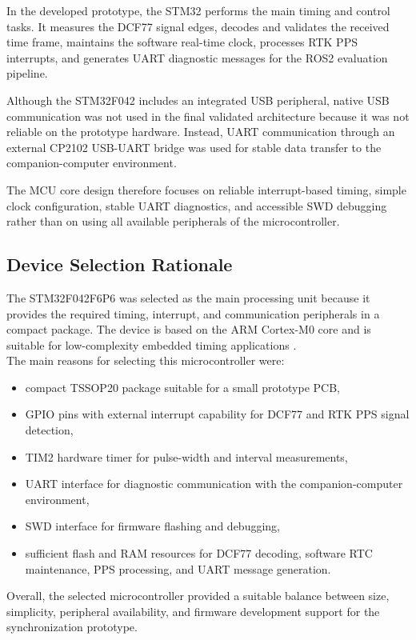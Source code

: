 In the developed prototype, the STM32 performs the main timing and control tasks. It measures the DCF77 signal edges, decodes and validates the received time frame, maintains the software real-time clock, processes RTK PPS interrupts, and generates UART diagnostic messages for the ROS2 evaluation pipeline.

Although the STM32F042 includes an integrated USB peripheral, native USB communication was not used in the final validated architecture because it was not reliable on the prototype hardware. Instead, UART communication through an external CP2102 USB-UART bridge was used for stable data transfer to the companion-computer environment.

The MCU core design therefore focuses on reliable interrupt-based timing, simple clock configuration, stable UART diagnostics, and accessible SWD debugging rather than on using all available peripherals of the microcontroller.

\subsection{Device Selection Rationale}

The STM32F042F6P6 was selected as the main processing unit because it provides the required timing, interrupt, and communication peripherals in a compact package. The device is based on the ARM Cortex-M0 core and is suitable for low-complexity embedded timing applications \cite{stm32F042Datasheet,stm32F0ReferenceManual}.
\\
The main reasons for selecting this microcontroller were:
\begin{itemize}
    \item compact TSSOP20 package suitable for a small prototype PCB,
    \item GPIO pins with external interrupt capability for DCF77 and RTK PPS signal detection,
    \item TIM2 hardware timer for pulse-width and interval measurements,
    \item UART interface for diagnostic communication with the companion-computer environment,
    \item SWD interface for firmware flashing and debugging,
    \item sufficient flash and RAM resources for DCF77 decoding, software RTC maintenance, PPS processing, and UART message generation.
\end{itemize}

Overall, the selected microcontroller provided a suitable balance between size, simplicity, peripheral availability, and firmware development support for the synchronization prototype.

